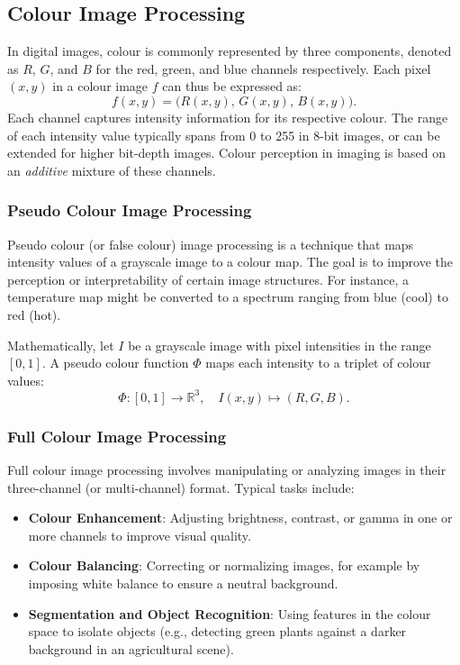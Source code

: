 \documentclass[a4paper,12pt]{article}
\begin{document}
\subsection{Colour Image Processing}

In digital images, colour is commonly represented by three components, denoted as \(R\), \(G\), and \(B\) for the red, green, and blue channels respectively. Each pixel \((x, y)\) in a colour image \(f\) can thus be expressed as:
\[
f(x, y) = \bigl(R(x, y),\, G(x, y),\, B(x, y)\bigr).
\]
Each channel captures intensity information for its respective colour. The range of each intensity value typically spans from 0 to 255 in 8-bit images, or can be extended for higher bit-depth images. Colour perception in imaging is based on an \emph{additive} mixture of these channels.

\subsubsection{Pseudo Colour Image Processing}

Pseudo colour (or false colour) image processing is a technique that maps intensity values of a grayscale image to a colour map. The goal is to improve the perception or interpretability of certain image structures. For instance, a temperature map might be converted to a spectrum ranging from blue (cool) to red (hot).

Mathematically, let \(I\) be a grayscale image with pixel intensities in the range \([0, 1]\). A pseudo colour function \(\Phi\) maps each intensity to a triplet of colour values:
\[
\Phi: [0,1] \rightarrow \mathbb{R}^3, \quad I(x,y) \mapsto (R, G, B).
\]

\subsubsection{Full Colour Image Processing}

Full colour image processing involves manipulating or analyzing images in their three-channel (or multi-channel) format. Typical tasks include:

\begin{itemize}
    \item \textbf{Colour Enhancement}: Adjusting brightness, contrast, or gamma in one or more channels to improve visual quality.
    \item \textbf{Colour Balancing}: Correcting or normalizing images, for example by imposing white balance to ensure a neutral background.
    \item \textbf{Segmentation and Object Recognition}: Using features in the colour space to isolate objects (e.g., detecting green plants against a darker background in an agricultural scene).
\end{itemize}
\end{document}
